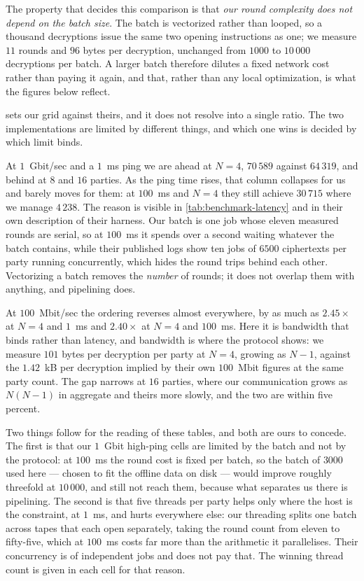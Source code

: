 The property that decides this comparison is that \emph{our round complexity does not depend on the batch size}.
The batch is vectorized rather than looped, so a thousand decryptions issue the same two opening instructions as one; we measure $11$ rounds and $96$ bytes per decryption, unchanged from $1000$ to $10\,000$ decryptions per batch.
A larger batch therefore dilutes a fixed network cost rather than paying it again, and that, rather than any local optimization, is what the figures below reflect.

 sets our grid against theirs, and it does not resolve into a single ratio.
The two implementations are limited by different things, and which one wins is decided by which limit binds.

At $1$~Gbit/sec and a $1$~ms ping we are ahead at $N = 4$, $70\,589$ against $64\,319$, and behind at $8$ and $16$ parties.
As the ping time rises, that column collapses for us and barely moves for them: at $100$~ms and $N = 4$ they still achieve $30\,715$ where we manage $4\,238$.
The reason is visible in \cref{tab:benchmark-latency} and in their own description of their harness.
Our batch is one job whose eleven measured rounds are serial, so at $100$~ms it spends over a second waiting whatever the batch contains, while their published logs show ten jobs of $6500$ ciphertexts per party running concurrently, which hides the round trips behind each other.
Vectorizing a batch removes the \emph{number} of rounds; it does not overlap them with anything, and pipelining does.

At $100$~Mbit/sec the ordering reverses almost everywhere, by as much as $2.45\times$ at $N = 4$ and $1$~ms and $2.40\times$ at $N = 4$ and $100$~ms.
Here it is bandwidth that binds rather than latency, and bandwidth is where the protocol shows: we measure $101$ bytes per decryption per party at $N = 4$, growing as $N-1$, against the $1.42$~kB per decryption implied by their own $100$~Mbit figures at the same party count.
The gap narrows at $16$ parties, where our communication grows as $N(N-1)$ in aggregate and theirs more slowly, and the two are within five percent.

Two things follow for the reading of these tables, and both are ours to concede.
The first is that our $1$~Gbit high-ping cells are limited by the batch and not by the protocol: at $100$~ms the round cost is fixed per batch, so the batch of $3000$ used here --- chosen to fit the offline data on disk --- would improve roughly threefold at $10\,000$, and still not reach them, because what separates us there is pipelining.
The second is that five threads per party helps only where the host is the constraint, at $1$~ms, and hurts everywhere else: our threading splits one batch across tapes that each open separately, taking the round count from eleven to fifty-five, which at $100$~ms costs far more than the arithmetic it parallelises.
Their concurrency is of independent jobs and does not pay that.
The winning thread count is given in each cell for that reason.

